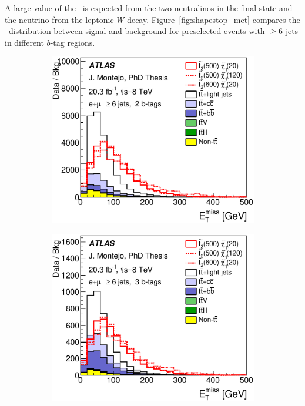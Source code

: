 A large value of the \met\ is expected from the two neutralinos in the final state and the neutrino from the leptonic $W$ decay.
Figure~\ref{fig:shapestop_met} compares the \met\ distribution between signal and background for preselected events with $\geq 6$ jets in different $b$-tag regions.

\begin{figure}[!tp]
\centering
\begin{subfigure}{0.32\textwidth}
\includegraphics[trim=0cm 5cm 0cm 0cm, clip=true, width=\textwidth]{Analysis/Figures_stop2/plots_stop2/ELEMUON/6jetin/2btagex/met_ELEMUON_6jetin2btagex_NOMINAL}
\caption{}\end{subfigure}
\begin{subfigure}{0.32\textwidth}
\includegraphics[trim=0cm 5cm 0cm 0cm, clip=true, width=\textwidth]{Analysis/Figures_stop2/plots_stop2/ELEMUON/6jetin/3btagex/met_ELEMUON_6jetin3btagex_NOMINAL}

\end{subfigure}
\end{figure}
